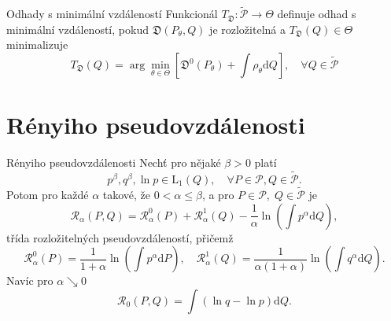 \documentclass[11pt,a4paper]{beamer}
\begin{document}
%		

\begin{frame}{Odhady s minimální vzdáleností}
	Funkcionál $T_\mathfrak{D}:\mathcal{\tilde{P}} \rightarrow \Theta$ definuje odhad s minimální vzdáleností, pokud  $\mathfrak{D}(P_\theta,Q)$ je rozložitelná a $T_\mathfrak{D}(Q) \in \Theta$ minimalizuje   
	\begin{equation*}
		T_\mathfrak{D}(Q) = \arg \min_{\theta \in \Theta} \left[ \mathfrak{D}^0 (P_\theta) + \int \rho_\theta \mathrm{d}Q \right], \quad \forall Q \in \mathcal{\tilde{P}}
	\end{equation*}
\end{frame}

\section{Rényiho pseudovzdálenosti} %

\begin{frame}{Rényiho pseudovzdálenosti}
	Nechť pro nějaké $\beta>0$ platí 
	\begin{equation*}
			p^\beta, q^\beta,\ln{p} \in \mathrm{L}_1(Q), \quad \forall P \in \mathcal{P}, Q \in \mathcal{\tilde{P}}.
	\end{equation*}
		Potom pro každé $\alpha$ takové, že $0 < \alpha \leq \beta$, a pro $P \in \mathcal{P}, \; Q \in \mathcal{\tilde{P}} $ je 
	\begin{equation*}
		\mathcal{R}_\alpha (P,Q) = \mathcal{R}_\alpha^0 (P) + \mathcal{R}_\alpha^1 (Q) - \dfrac{1}{\alpha} \ln{\left( \int{p^\alpha \mathrm{d}Q } \right)},
	\end{equation*}	
	třída rozložitelných pseudovzdáleností, přičemž 
	\begin{equation*}
		\mathcal{R}_\alpha^0 (P) = \dfrac{1}{1+\alpha}\ln{\left( \int{p^\alpha \mathrm{d}P } \right)}, \quad \mathcal{R}_\alpha^1 (Q) = \dfrac{1}{\alpha (1+\alpha)}\ln{\left( \int{q^\alpha \mathrm{d}Q } \right)}.
	\end{equation*}
	Navíc pro $\alpha \searrow 0$
	\begin{equation*}
		\mathcal{R}_0 (P,Q) = \int{\left( \ln{q} - \ln{p} \right)\mathrm{d}Q}.
	\end{equation*}
\end{frame}
\end{document}
